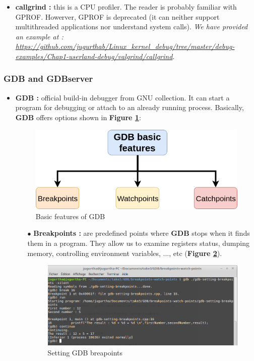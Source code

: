 \begin{itemize}
	\item \textbf{callgrind : } this is a CPU profiler. The reader is probably familiar with GPROF. Howerver, GPROF is deprecated (it can neither support multithreaded applications nor understand system calls).
\textit{We have provided an example at : {\color{blue}\url{https://github.com/jugurthab/Linux_kernel_debug/tree/master/debug-examples/Chap1-userland-debug/valgrind/callgrind}}}.


\end{itemize}

\subsubsection{GDB and GDBserver}


\begin{itemize}
	\item \textbf{GDB : } official build-in debugger from GNU collection. It can  start a program for debugging or attach to an already running process. Basically, \textbf{GDB} offers options shown in \textbf{Figure \ref{Basic features of GDB}}:
\begin{figure}[H]
		\centering
        \includegraphics[scale=0.40]{img/solution/basic-usage-gdb.png}
        \caption{Basic features of GDB}
        \label{Basic features of GDB}
    \end{figure}	
	
\begin{itemize}
\item[$\bullet$] \textbf{Breakpoints : } are predefined points where \textbf{GDB} stops when it finds them in a program. They allow us to examine registers status,
dumping memory, controlling environment variables, ..., etc (\textbf{Figure \ref{Setting GDB breapoints}}).
\begin{figure}[H]
		\centering
        \includegraphics[scale=0.30]{img/solution/gdb-break-continue.png}
        \caption{Setting GDB breapoints}
        \label{Setting GDB breapoints}
    \end{figure}	




\end{itemize}
\end{itemize}
